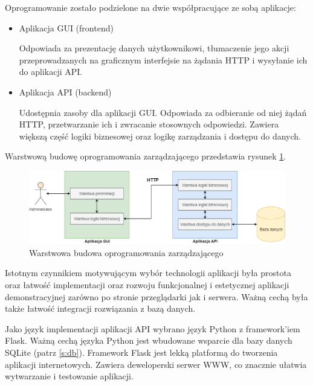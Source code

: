     	Oprogramowanie zostało podzielone na dwie współpracujące ze sobą aplikacje:

    	\begin{itemize}
    		\item Aplikacja GUI (frontend)

    			Odpowiada za prezentację danych użytkownikowi, tłumaczenie jego akcji przeprowadzanych na graficznym interfejsie na żądania HTTP i wysyłanie ich do aplikacji API.

    		\item Aplikacja API (backend)

    			Udostępnia zasoby dla aplikacji GUI. Odpowiada za odbieranie od niej żądań HTTP, przetwarzanie ich i zwracanie stosownych odpowiedzi. Zawiera większą część logiki biznesowej oraz logikę zarządzania i dostępu do danych.
    	\end{itemize}

    	Warstwową budowę oprogramowania zarządzającego przedstawia rysunek \ref{fig:mngmt_subs_layers}.

        \begin{figure}[]
            \centering
            \includegraphics[width=\textwidth]{chapters/images/mngmt_subsystem_layers.png}
            \caption{Warstwowa budowa oprogramowania zarządzającego}
            \label{fig:mngmt_subs_layers}
        \end{figure}

       	Istotnym czynnikiem motywującym wybór technologii aplikacji była prostota oraz łatwość implementacji oraz rozwoju funkcjonalnej i estetycznej aplikacji demonstracyjnej zarówno po stronie przeglądarki jak i serwera. Ważną cechą była także łatwość integracji rozwiązania z bazą danych. 

		Jako język implementacji aplikacji API wybrano język Python z framework'iem Flask. Ważną cechą języka Python jest wbudowane wsparcie dla bazy danych SQLite (patrz \ref{s:db}). Framework Flask jest lekką platformą do tworzenia aplikacji internetowych. Zawiera deweloperski serwer WWW, co znacznie ułatwia wytwarzanie i testowanie aplikacji.


